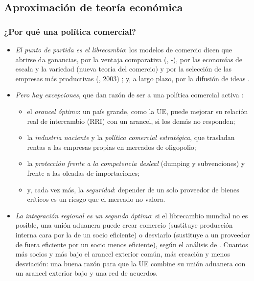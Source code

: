 \documentclass[11pt]{article}
\begin{document}
\subsection{Aproximación de teoría económica}\label{sec:teoria}

\subsubsection{¿Por qué una política comercial?}\label{sec:porque}

\begin{itemize}
\item \emph{El punto de partida es el librecambio}: los modelos de comercio dicen que abrirse da ganancias, por la ventaja comparativa (, -), por las economías de escala y la variedad (nueva teoría del comercio) y por la selección de las empresas más productivas (, 2003)  ; y, a largo plazo, por la difusión de ideas .
\item \emph{Pero hay excepciones}, que dan razón de ser a una política comercial activa  :
  \begin{itemize}
  \item el \emph{arancel óptimo}: un país grande, como la UE, puede mejorar su relación real de intercambio (RRI) con un arancel, si los demás no responden;
  \item la \emph{industria naciente} y la \emph{política comercial estratégica}, que trasladan rentas a las empresas propias en mercados de oligopolio;
  \item la \emph{protección frente a la competencia desleal} (dumping y subvenciones) y frente a las oleadas de importaciones;
  \item y, cada vez más, la \emph{seguridad}: depender de un solo proveedor de bienes críticos es un riesgo que el mercado no valora.
  \end{itemize}
\item \emph{La integración regional es un segundo óptimo}: si el librecambio mundial no es posible, una unión aduanera puede crear comercio (sustituye producción interna cara por la de un socio eficiente) o desviarlo (sustituye a un proveedor de fuera eficiente por un socio menos eficiente), según el análisis de \textcite{Viner1950Customs} . Cuantos más socios y más bajo el arancel exterior común, más creación y menos desviación: una buena razón para que la UE combine su unión aduanera con un arancel exterior bajo y una red de acuerdos.
\end{itemize}
\end{document}
